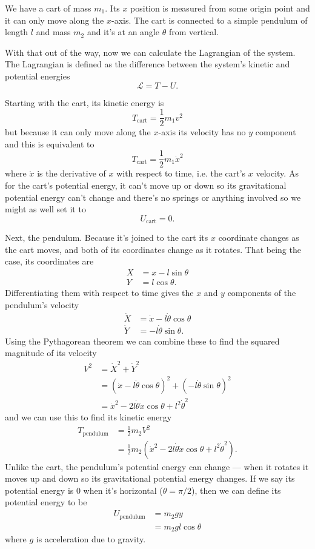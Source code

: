 \documentclass{article}
\begin{document}
We have a cart of mass $m_1$. Its $x$ position is measured from some origin point and it can only move along the $x$-axis. The cart is connected to a simple pendulum of length $l$ and mass $m_2$ and it's at an angle $\theta$ from vertical.

With that out of the way, now we can calculate the Lagrangian of the system. The Lagrangian is defined as the difference between the system's kinetic and potential energies \[\mathcal{L} = T - U.\]

Starting with the cart, its kinetic energy is \[T_\text{cart} = \frac{1}{2} m_1 v^2\] but because it can only move along the $x$-axis its velocity has no $y$ component and this is equivalent to \[T_\text{cart} = \frac{1}{2} m_1 \dot{x}^2\] where $\dot{x}$ is the derivative of $x$ with respect to time, i.e. the cart's $x$ velocity. As for the cart's potential energy, it can't move up or down so its gravitational potential energy can't change and there's no springs or anything involved so we might as well set it to \[U_\text{cart} = 0.\]

Next, the pendulum. Because it's joined to the cart its $x$ coordinate changes as the cart moves, and both of its coordinates change as it rotates. That being the case, its coordinates are \begin{align*}
  X & = x - l \sin \theta \\
  Y & = l \cos \theta.
\end{align*} Differentiating them with respect to time gives the $x$ and $y$ components of the pendulum's velocity \begin{align*}
  \dot{X} & = \dot{x} - l \dot{\theta} \cos \theta \\
  \dot{Y} & = -l \dot{\theta} \sin \theta.
\end{align*} Using the Pythagorean theorem we can combine these to find the squared magnitude of its velocity \begin{align*}
  V^2 & = \dot{X}^2 + \dot{Y}^2                                                      \\
      & = (\dot{x} - l \dot{\theta} \cos \theta)^2 + (-l \dot{\theta} \sin \theta)^2 \\
      & = \dot{x}^2 - 2 l \dot{\theta} \dot{x} \cos \theta + l^2 \dot{\theta}^2
\end{align*}
and we can use this to find its kinetic energy \begin{align*}
  T_\text{pendulum} & = \frac{1}{2} m_2 V^2                                                                      \\
                    & = \frac{1}{2} m_2 (\dot{x}^2 - 2 l \dot{\theta} \dot{x} \cos \theta + l^2 \dot{\theta}^2).
\end{align*} Unlike the cart, the pendulum's potential energy can change — when it rotates it moves up and down so its gravitational potential energy changes. If we say its potential energy is $0$ when it's horizontal ($\theta = \pi / 2$), then we can define its potential energy to be \begin{align*}
  U_\text{pendulum} & = m_2 g y             \\
                    & = m_2 g l \cos \theta
\end{align*} where $g$ is acceleration due to gravity.
\end{document}
